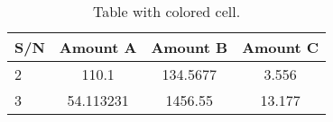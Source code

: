 \documentclass{article}
\begin{document}
	
\begin{table}[h!]
		\centering
		\caption{Table with colored cell.}
		\label{tab:table1}
		\begin{tabular}{|l|S|S|c|} %
			\hline
			\textbf{S/N} & \textbf{Amount A} & \textbf{Amount B} & \textbf{Amount C}\\
			\hline
			2 & 110.1 & 134.5677 & 3.556\\
			3 & 54.113231 & 1456.55 & 13.177\\
			\hline
		\end{tabular}
		
\end{table}
\end{document}
